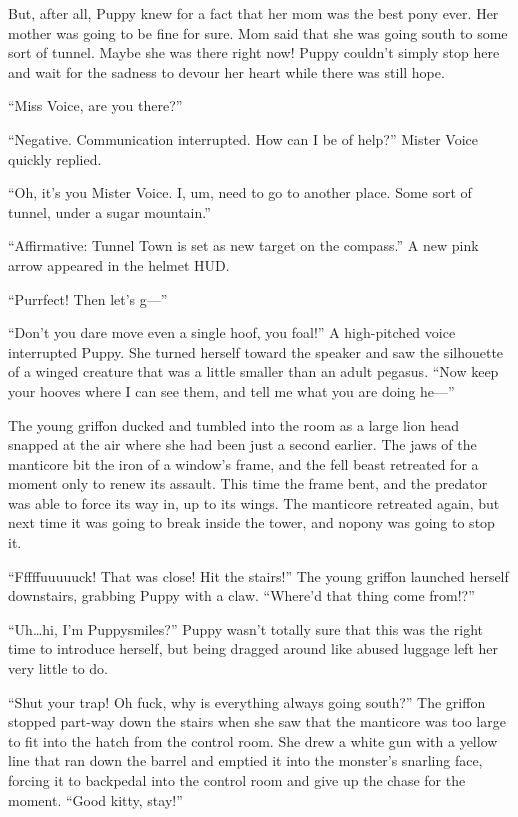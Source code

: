 But, after all, Puppy knew for a fact that her mom was the best pony ever. Her mother was going to be fine for sure. Mom said that she was going south to some sort of tunnel. Maybe she was there right now! Puppy couldn't simply stop here and wait for the sadness to devour her heart while there was still hope.

``Miss Voice, are you there?''

{\mt ``Negative. Communication interrupted. How can I be of help?'' Mister Voice quickly replied.}

``Oh, it's you Mister Voice. I, um, need to go to another place. Some sort of tunnel, under a sugar mountain.''

{\mt ``Affirmative: Tunnel Town is set as new target on the compass.'' A new pink arrow appeared in the helmet HUD.}

``Purrfect! Then let's g---''

``Don't you dare move even a single hoof, you foal!'' A high-pitched voice interrupted Puppy. She turned herself toward the speaker and saw the silhouette of a winged creature that was a little smaller than an adult pegasus. ``Now keep your hooves where I can see them, and tell me what you are doing he---'' 


The young griffon ducked and tumbled into the room as a large lion head snapped at the air where she had been just a second earlier. The jaws of the manticore bit the iron of a window's frame, and the fell beast retreated for a moment only to renew its assault. This time the frame bent, and the predator was able to force its way in, up to its wings. The manticore retreated again, but next time it was going to break inside the tower, and nopony was going to stop it.

``Fffffuuuuuck! That was close! Hit the stairs!'' The young griffon launched herself downstairs, grabbing Puppy with a claw. ``Where'd that thing come from!?''

``Uh\dots hi, I'm Puppysmiles?'' Puppy wasn't totally sure that this was the right time to introduce herself, but being dragged around like abused luggage left her very little to do.

``Shut your trap! Oh fuck, why is everything always going south?'' The griffon stopped part-way down the stairs when she saw that the manticore was too large to fit into the hatch from the control room. She drew a white gun with a yellow line that ran down the barrel and emptied it into the monster's snarling face, forcing it to backpedal into the control room and give up the chase for the moment. ``Good kitty, stay!''

